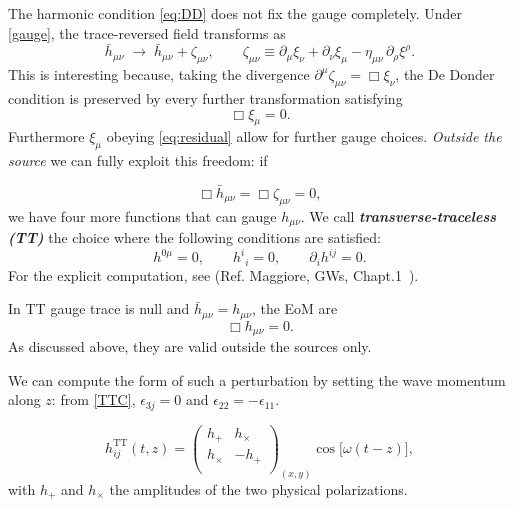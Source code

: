 \documentclass[12pt,a4paper,oneside]{article}
\numberwithin{equation}{section}   %
\begin{document}
The harmonic condition \eqref{eq:DD} does not fix the gauge completely.
Under \eqref{gauge}, the trace-reversed field transforms as
\begin{equation}
  \bar h_{\mu\nu}\;\to\;\bar h_{\mu\nu}+\zeta_{\mu\nu},
  \qquad
  \zeta_{\mu\nu}\equiv\partial_\mu\xi_\nu+\partial_\nu\xi_\mu
  -\eta_{\mu\nu}\,\partial_\rho\xi^\rho .
  \label{eq:xi-shift}
\end{equation}
This is interesting because, taking the divergence
$\partial^\mu\zeta_{\mu\nu}=\Box\xi_\nu$, the De Donder condition is
preserved by every further transformation satisfying
\begin{equation}
  \Box\xi_\mu=0 .
  \label{eq:residual}
\end{equation}
Furthermore $\xi_\mu$ 
 obeying \eqref{eq:residual} allow for further
gauge choices. \textit{Outside the source} we can fully exploit this freedom: if 

\begin{equation} 
    \Box \bar{h}_{\mu\nu} = \Box \zeta_{\mu\nu}=0, 
\end{equation}
 we have four more functions that 
 can gauge $h_{\mu\nu}$. 
We call
\textbf{\textit{transverse-traceless (TT)}} the choice where the
following conditions are satisfied:
\begin{equation}
\boxed{
  h^{0\mu}=0, \qquad h^i{}_i=0, \qquad \partial_i h^{ij}=0.
}
\label{TTC}
\end{equation}
For the explicit computation, see (Ref. Maggiore, GWs, Chapt.1~\cite{Maggiore2008}).

In TT gauge trace is null and $\bar h_{\mu\nu}=h_{\mu\nu}$, the EoM are
\begin{equation}
  \boxed{\Box h_{\mu\nu}=0.}
\end{equation}
As discussed above, they are valid outside the sources only.

We can compute the form of such a perturbation by setting
the wave momentum along $z$: from \eqref{TTC}, $\epsilon_{3j}=0$ and
 $\epsilon_{22}=-\epsilon_{11}$. 
 
\begin{equation}\boxed{
  h^{\mathrm{TT}}_{ij}(t,z)=
  \begin{pmatrix}
    h_+ & h_\times \\
    h_\times & -h_+ \\
  \end{pmatrix}_{(x,y)}
  \cos\!\bigl[\omega(t-z)\bigr],
  \label{eq:TT-wave}}
\end{equation}
with $h_+$ and $h_\times$ the amplitudes of the two physical polarizations.
\end{document}
